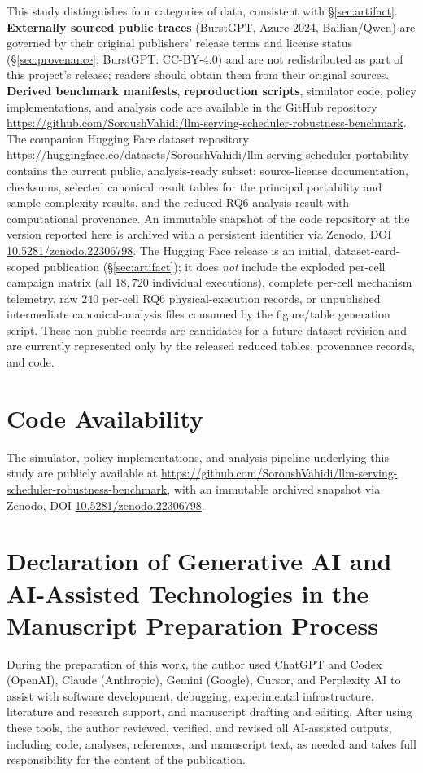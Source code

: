 This study distinguishes four categories of data, consistent with
\S\ref{sec:artifact}. \textbf{Externally sourced public traces} (BurstGPT,
Azure 2024, Bailian/Qwen) are governed by their original publishers' release
terms and license status (\S\ref{sec:provenance}; BurstGPT: CC-BY-4.0) and
are not redistributed as part of this project's release; readers should
obtain them from their original sources. \textbf{Derived benchmark manifests},
\textbf{reproduction scripts}, simulator code, policy implementations, and
analysis code are available in the GitHub repository
\url{https://github.com/SoroushVahidi/llm-serving-scheduler-robustness-benchmark}.
The companion Hugging Face dataset repository
\url{https://huggingface.co/datasets/SoroushVahidi/llm-serving-scheduler-portability}
contains the current public, analysis-ready subset: source-license
documentation, checksums, selected canonical result tables for the principal
portability and sample-complexity results, and the reduced RQ6 analysis
result with computational provenance.
An immutable snapshot of the code repository at the version reported here is
archived with a persistent identifier via Zenodo, DOI
\href{https://doi.org/10.5281/zenodo.22306798}{10.5281/zenodo.22306798}.
The Hugging Face release is an initial, dataset-card-scoped publication
(\S\ref{sec:artifact}); it does \emph{not} include the exploded per-cell
campaign matrix (all $18{,}720$ individual executions), complete per-cell
mechanism telemetry, raw $240$ per-cell RQ6 physical-execution records, or
unpublished intermediate canonical-analysis files consumed by the figure/table
generation script. These non-public records are candidates for a future
dataset revision and are currently represented only by the released reduced
tables, provenance records, and code.

\section*{Code Availability}

The simulator, policy implementations, and analysis pipeline underlying this
study are publicly available at
\url{https://github.com/SoroushVahidi/llm-serving-scheduler-robustness-benchmark},
with an immutable archived snapshot via Zenodo, DOI
\href{https://doi.org/10.5281/zenodo.22306798}{10.5281/zenodo.22306798}.

\section*{Declaration of Generative AI and AI-Assisted Technologies in the Manuscript Preparation Process}

During the preparation of this work, the author used ChatGPT and Codex
(OpenAI), Claude (Anthropic), Gemini (Google), Cursor, and Perplexity AI to
assist with software development, debugging, experimental infrastructure,
literature and research support, and manuscript drafting and editing. After
using these tools, the author reviewed, verified, and revised all AI-assisted
outputs, including code, analyses, references, and manuscript text, as needed
and takes full responsibility for the content of the publication.
